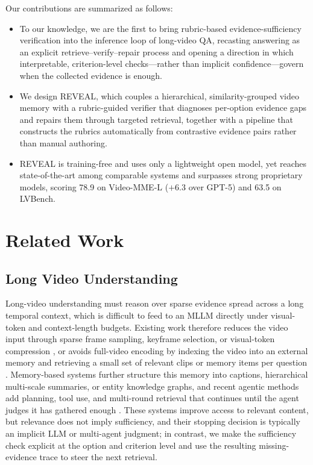 \documentclass[letterpaper]{article} %
\begin{document}
Our contributions are summarized as follows:
\begin{itemize}
    \item To our knowledge, we are the first to bring rubric-based evidence-sufficiency verification into the inference loop of long-video QA, recasting answering as an explicit retrieve--verify--repair process and opening a direction in which interpretable, criterion-level checks---rather than implicit confidence---govern when the collected evidence is enough.
    \item We design REVEAL, which couples a hierarchical, similarity-grouped video memory with a rubric-guided verifier that diagnoses per-option evidence gaps and repairs them through targeted retrieval, together with a pipeline that constructs the rubrics automatically from contrastive evidence pairs rather than manual authoring.
    \item REVEAL is training-free and uses only a lightweight open model, yet reaches state-of-the-art among comparable systems and surpasses strong proprietary models, scoring 78.9 on Video-MME-L ($+6.3$ over GPT-5) and 63.5 on LVBench.
\end{itemize}



\section{Related Work}

\subsection{Long Video Understanding}

Long-video understanding must reason over sparse evidence spread across a long temporal context, which is difficult to feed to an MLLM directly under visual-token and context-length budgets. Existing work therefore reduces the video input through sparse frame sampling, keyframe selection, or visual-token compression \citep{video_chatgpt,video_llava,llama_vid,chat_univi,longvu,sun2025videosalmonns}, or avoids full-video encoding by indexing the video into an external memory and retrieving a small set of relevant clips or memory items per question \citep{lewis2020rag,karpukhin2020dpr,video_rag,fan2024videoagentmemory,yeo2025worldmm,tian2025egor1}. Memory-based systems further structure this memory into captions, hierarchical multi-scale summaries, or entity knowledge graphs, and recent agentic methods add planning, tool use, and multi-round retrieval that continues until the agent judges it has gathered enough \citep{moviechat,ma_lmm,wang2024videoagentlongform,yang2024vca,chen2025lvagent,wang2025avp}. These systems improve access to relevant content, but relevance does not imply sufficiency, and their stopping decision is typically an implicit LLM or multi-agent judgment; in contrast, we make the sufficiency check explicit at the option and criterion level and use the resulting missing-evidence trace to steer the next retrieval.
\end{document}
